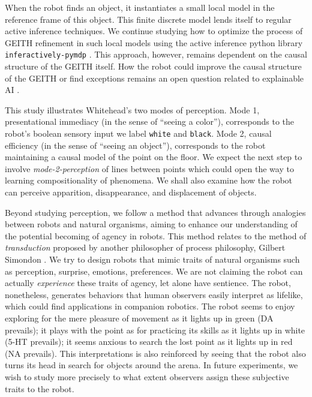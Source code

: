 \documentclass[runningheads]{llncs}
\begin{document}
When the robot finds an object, it instantiates a small local model in the reference frame of this object. 
This finite discrete model lends itself to regular active inference techniques. 
We continue studying how to optimize the process of GEITH refinement in such local models using the active inference python library  \texttt{inferac\-tively-pymdp} \cite{Heins2022}.
This approach, however, remains dependent on the causal structure of the GEITH itself.
How the robot could improve the causal structure of the GEITH or find exceptions remains an open question related to explainable AI \cite{thorisson_explanation_2021}.

This study illustrates Whitehead's two modes of perception. 
Mode 1, presentational immediacy (in the sense of ``seeing a color''), corresponds to the robot's boolean sensory input we label \texttt{white} and \texttt{black}. 
Mode 2, causal efficiency (in the sense of ``seeing an object''), corresponds to the robot maintaining a causal model of the point on the floor. 
We expect the next step to involve \textit{mode-2-perception} of lines between points which could open the way to learning compositionality of phenomena. 
We shall also examine how the robot can perceive apparition, disappearance, and displacement of objects. 

Beyond studying perception, we follow a method that advances through analogies between robots and natural organisms, aiming to enhance our understanding of the potential becoming of agency in robots. 
This method relates to the method of \textit{transduction} proposed by another philosopher of process philosophy, Gilbert Simondon \cite{simondon_individuation_2005}.
We try to design robots that mimic traits of natural organisms such as perception, surprise, emotions, preferences.
We are not claiming the robot can actually \textit{experience} these traits of agency, let alone have sentience. 
The robot, nonetheless, generates behaviors that human observers easily interpret as lifelike, which could find applications in companion robotics.
The robot seems to enjoy exploring for the mere pleasure of movement as it lights up in green (DA prevails); 
it plays with the point as for practicing its skills as it lights up in white (5-HT prevails); 
it seems anxious to search the lost point as it lights up in red (NA prevails). 
This interpretations is also reinforced by seeing that the robot also turns its head in search for objects around the arena.
In future experiments, we wish to study more precisely to what extent observers assign these subjective traits to the robot.
\end{document}
